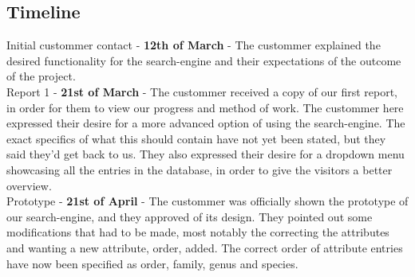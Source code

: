 \documentclass[12pt,a4paper]{article}
\begin{document}
\subsection{Timeline}

	Initial custommer contact - {\bf 12th of March} - The custommer explained the desired functionality for the search-engine and their expectations of the outcome of the project. \\
	
	
	Report 1 - {\bf 21st of March} - The custommer received a copy of our first report, in order for them to view our progress and method of work.
	The custommer here expressed their desire for a more advanced option of using the search-engine. The exact specifics of what this should contain have not yet been stated, but they said they'd get back to us.
	They also expressed their desire for a dropdown menu showcasing all the entries in the database, in order to give the visitors a better overview.\\
	
	
	Prototype - {\bf 21st of April} - The custommer was officially shown the prototype of our search-engine, and they approved of its design. They pointed out some modifications that had to be made, most notably the correcting the attributes and wanting a new attribute, order, added. The correct order of attribute entries have now been specified as order, family, genus and species.\\
\end{document}
